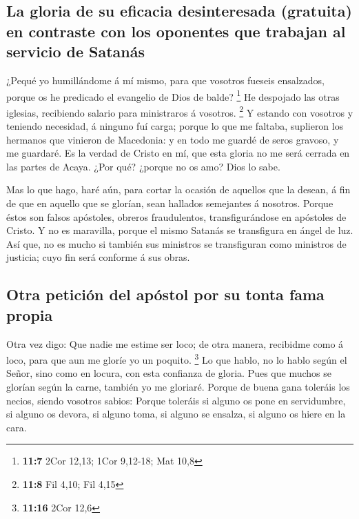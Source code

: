 \hypertarget{la-gloria-de-su-eficacia-desinteresada-gratuita-en-contraste-con-los-oponentes-que-trabajan-al-servicio-de-satanuxe1s}{%
\subsection{La gloria de su eficacia desinteresada (gratuita) en
contraste con los oponentes que trabajan al servicio de
Satanás}\label{la-gloria-de-su-eficacia-desinteresada-gratuita-en-contraste-con-los-oponentes-que-trabajan-al-servicio-de-satanuxe1s}}

 ¿Pequé yo humillándome á mí mismo, para que vosotros
fueseis ensalzados, porque os he predicado el evangelio de Dios de
balde? \footnote{\textbf{11:7} 2Cor 12,13; 1Cor 9,12-18; Mat 10,8}
 He despojado las otras iglesias, recibiendo salario para
ministraros á vosotros. \footnote{\textbf{11:8} Fil 4,10; Fil 4,15}
 Y estando con vosotros y teniendo necesidad, á ninguno fuí
carga; porque lo que me faltaba, suplieron los hermanos que vinieron de
Macedonia: y en todo me guardé de seros gravoso, y me guardaré.
 Es la verdad de Cristo en mí, que esta gloria no me será
cerrada en las partes de Acaya.  ¿Por qué? ¿porque no os
amo? Dios lo sabe.

 Mas lo que hago, haré aún, para cortar la ocasión de
aquellos que la desean, á fin de que en aquello que se glorían, sean
hallados semejantes á nosotros.  Porque éstos son falsos
apóstoles, obreros fraudulentos, transfigurándose en apóstoles de
Cristo.  Y no es maravilla, porque el mismo Satanás se
transfigura en ángel de luz.  Así que, no es mucho si
también sus ministros se transfiguran como ministros de justicia; cuyo
fin será conforme á sus obras.

\hypertarget{otra-peticiuxf3n-del-apuxf3stol-por-su-tonta-fama-propia}{%
\subsection{Otra petición del apóstol por su tonta fama
propia}\label{otra-peticiuxf3n-del-apuxf3stol-por-su-tonta-fama-propia}}

 Otra vez digo: Que nadie me estime ser loco; de otra
manera, recibidme como á loco, para que aun me gloríe yo un poquito.
\footnote{\textbf{11:16} 2Cor 12,6}  Lo que hablo, no lo
hablo según el Señor, sino como en locura, con esta confianza de gloria.
 Pues que muchos se glorían según la carne, también yo me
gloriaré.  Porque de buena gana toleráis los necios, siendo
vosotros sabios:  Porque toleráis si alguno os pone en
servidumbre, si alguno os devora, si alguno toma, si alguno se ensalza,
si alguno os hiere en la cara.


